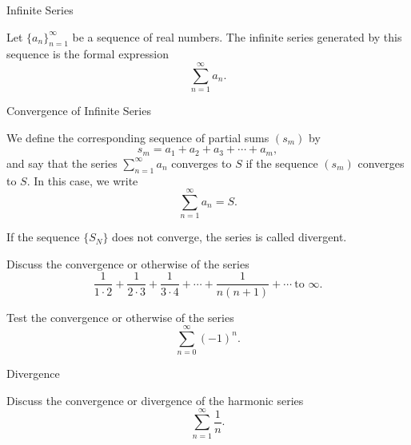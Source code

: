 \documentclass[12pt, a4paper]{article}
\begin{document}
\FrontPage
\Large

\begin{heading}
	Infinite Series
\end{heading}

\begin{definition}
	Let $\{a_n\}_{n=1}^{\infty}$ be a sequence of real numbers.  
	The infinite series generated by this sequence is the formal expression
	\[
	\sum_{n=1}^{\infty} a_n .
	\]
\end{definition}

\clearpage

\begin{heading}
	Convergence of Infinite Series
\end{heading}

\begin{definition}
	We define the corresponding sequence of partial sums $(s_m)$ by
	\[
	s_m = a_1 + a_2 + a_3 + \cdots + a_m,
	\]
	and say that the series 
	\(
	\sum_{n=1}^{\infty} a_n
	\)
	converges to $S$ if the sequence $(s_m)$ converges to $S$.  
	In this case, we write
	\[
	\sum_{n=1}^{\infty} a_n = S.
	\]
	\vspace{5pt}
	
	If the sequence $\{S_N\}$ does not converge, the series is called divergent.
\end{definition}

\clearpage

\begin{problem}
	Discuss the convergence or otherwise of the series
	\[
	\frac{1}{1\cdot 2} + \frac{1}{2\cdot 3} + \frac{1}{3\cdot 4} + \cdots + \frac{1}{n(n+1)} + \cdots\ \text{to } \infty.
	\]
\end{problem}


\clearpage

\begin{problem}
	Test the convergence or otherwise of the series
	\[
	\sum_{n=0}^{\infty} (-1)^n .
	\]
\end{problem}

\clearpage

\begin{heading}
	Divergence
\end{heading}

\vspace{10pt}

\begin{problem}
	Discuss the convergence or divergence of the harmonic series
	\[
	\sum_{n=1}^{\infty} \frac{1}{n}.
	\]
\end{problem}
\end{document}
